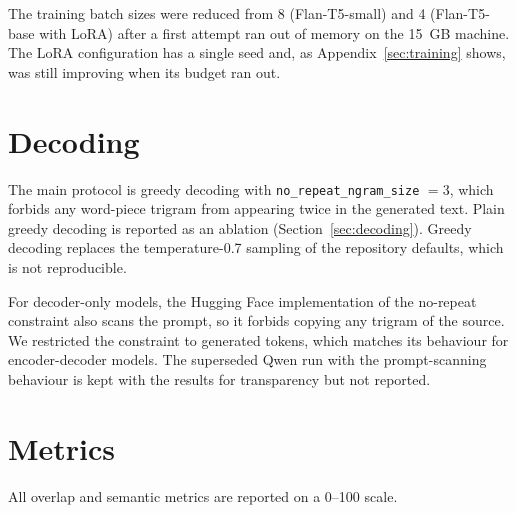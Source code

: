 The training batch sizes were reduced from 8 (Flan-T5-small) and 4 (Flan-T5-base with LoRA) after a first attempt ran out of memory on the 15~GB machine. The LoRA configuration has a single seed and, as Appendix~\ref{sec:training} shows, was still improving when its budget ran out.

\section{Decoding}
\label{sec:decoding_protocol}

The main protocol is greedy decoding with \texttt{no\_repeat\_ngram\_size} $= 3$, which forbids any word-piece trigram from appearing twice in the generated text. Plain greedy decoding is reported as an ablation (Section~\ref{sec:decoding}). Greedy decoding replaces the temperature-0.7 sampling of the repository defaults, which is not reproducible.

For decoder-only models, the Hugging Face implementation of the no-repeat constraint also scans the prompt, so it forbids copying any trigram of the source. We restricted the constraint to generated tokens, which matches its behaviour for encoder-decoder models. The superseded Qwen run with the prompt-scanning behaviour is kept with the results for transparency but not reported.

\section{Metrics}
\label{sec:metrics}

All overlap and semantic metrics are reported on a 0--100 scale.

